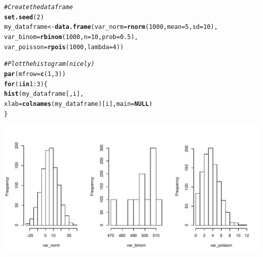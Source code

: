 \documentclass{article}\usepackage[]{graphicx}\usepackage[]{color}
\makeatletter
\def\maxwidth{ %
  \ifdim\Gin@nat@width>\linewidth
    \linewidth
  \else
    \Gin@nat@width
  \fi
}
\newcommand{\hlnum}[1]{\textcolor[rgb]{0.686,0.059,0.569}{#1}}%
\newcommand{\hlcom}[1]{\textcolor[rgb]{0.678,0.584,0.686}{\textit{#1}}}%
\newcommand{\hlopt}[1]{\textcolor[rgb]{0,0,0}{#1}}%
\newcommand{\hlstd}[1]{\textcolor[rgb]{0.345,0.345,0.345}{#1}}%
\newcommand{\hlkwa}[1]{\textcolor[rgb]{0.161,0.373,0.58}{\textbf{#1}}}%
\newcommand{\hlkwb}[1]{\textcolor[rgb]{0.69,0.353,0.396}{#1}}%
\newcommand{\hlkwc}[1]{\textcolor[rgb]{0.333,0.667,0.333}{#1}}%
\newcommand{\hlkwd}[1]{\textcolor[rgb]{0.737,0.353,0.396}{\textbf{#1}}}%
\newenvironment{kframe}{%
 \def\at@end@of@kframe{}%
 \ifinner\ifhmode%
  \def\at@end@of@kframe{\end{minipage}}%
  \begin{minipage}{\columnwidth}%
 \fi\fi%
 \def\FrameCommand##1{\hskip\@totalleftmargin \hskip-\fboxsep
 \colorbox{shadecolor}{##1}\hskip-\fboxsep
     \hskip-\linewidth \hskip-\@totalleftmargin \hskip\columnwidth}%
 \MakeFramed {\advance\hsize-\width
   \@totalleftmargin\z@ \linewidth\hsize
   \@setminipage}}%
 {\par\unskip\endMakeFramed%
 \at@end@of@kframe}
\newenvironment{knitrout}{}{} %
\makeatother
\begin{document}
\begin{knitrout}
\color{fgcolor}\begin{kframe}
\begin{alltt}
\hlcom{# Create the data frame}
\hlkwd{set.seed}\hlstd{(}\hlnum{2}\hlstd{)}
\hlstd{my_dataframe} \hlkwb{<-} \hlkwd{data.frame}\hlstd{(}\hlkwc{var_norm} \hlstd{=} \hlkwd{rnorm}\hlstd{(}\hlnum{1000}\hlstd{,} \hlkwc{mean} \hlstd{=} \hlnum{5}\hlstd{,} \hlkwc{sd} \hlstd{=} \hlnum{10}\hlstd{),}
                           \hlkwc{var_binom} \hlstd{=} \hlkwd{rbinom}\hlstd{(}\hlnum{1000}\hlstd{,} \hlkwc{n} \hlstd{=} \hlnum{10}\hlstd{,} \hlkwc{prob} \hlstd{=} \hlnum{0.5}\hlstd{),}
                           \hlkwc{var_poisson} \hlstd{=} \hlkwd{rpois}\hlstd{(}\hlnum{1000}\hlstd{,} \hlkwc{lambda} \hlstd{=} \hlnum{4}\hlstd{))}
\end{alltt}
\end{kframe}
\end{knitrout}

\begin{knitrout}
\color{fgcolor}\begin{kframe}
\begin{alltt}
\hlcom{# Plot the histogram (nicely)}
\hlkwd{par}\hlstd{(}\hlkwc{mfrow} \hlstd{=} \hlkwd{c}\hlstd{(}\hlnum{1}\hlstd{,} \hlnum{3}\hlstd{))}
\hlkwa{for} \hlstd{(i} \hlkwa{in} \hlnum{1}\hlopt{:}\hlnum{3}\hlstd{) \{}
  \hlkwd{hist}\hlstd{(my_dataframe[ , i],}
       \hlkwc{xlab} \hlstd{=} \hlkwd{colnames}\hlstd{(my_dataframe)[i],} \hlkwc{main} \hlstd{=} \hlkwa{NULL}\hlstd{)}
\hlstd{\}}
\end{alltt}
\end{kframe}
\includegraphics[width=\maxwidth]{figure/unnamed-chunk-2-1} 

\end{knitrout}
\end{document}
